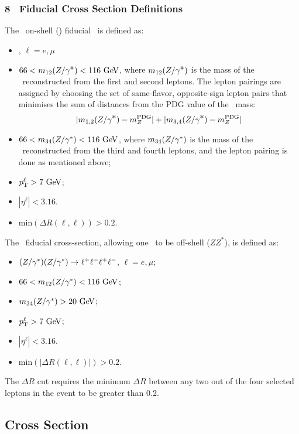 \subsubsection{8 \tev\ Fiducial Cross Section Definitions}

The \zzllll\ on-shell (\ZZ) fiducial \cx\ is defined as:

\begin{itemize}
\item{\ZorgZorglplmlplm, $\ell = e,\mu$}
\item{ $66 < m_{12}(\Zorgv) <  116\GeV$, where $m_{12}(Z/\gamma^{\textstyle *})$ is
the mass of the \Z\ reconstructed from the first and second leptons.  The
lepton pairings are assigned by choosing the set of 
same-flavor, opposite-sign lepton pairs that minimises the sum of distances from
the PDG value of the \Z\ mass:
\begin{equation}
|m_{1,2}(Z/\gamma^{\textstyle *}) - m_{Z}^{\rm PDG}| + |m_{3,4}(Z/\gamma^{\textstyle *}) - m_{Z}^{\rm PDG}|
\end{equation}
}
\item{ $66 < m_{34}(\Z/\gamma^*) <  116\GeV$, where $m_{34}(Z/\gamma^*)$ is
the mass of the \Z\ reconstructed from the third and fourth leptons, and the
lepton pairing is done as mentioned above;}
\item $\pT^{\ell} > 7\GeV$;
\item $|\eta^{\ell}| < 3.16$.
\item{$\mathrm{min}(\Delta R(\ell,\ell)) > 0.2$.}
\end{itemize}

The \zzllll\ fiducial cross-section, allowing one \Z\ to be off-shell ($ZZ^*$), is defined as:

\begin{itemize}
\item $(Z/\gamma^*)(Z/\gamma^*)\rightarrow\ell^+ \ell^-\ell^+ \ell^-$, $\ell = e,\mu$;
\item $66 < m_{12}(\Z/\gamma^*) <  116\GeV$;
\item $m_{34}(\Z/\gamma^*) > 20\GeV$;
\item $\pT^{\ell} > 7\GeV$;
\item $|\eta^{\ell}| < 3.16$.
\item $\mathrm{min}(|\Delta R(\ell,\ell)|) > 0.2$.
\end{itemize}

The $\Delta R$ cut requires the minimum $\Delta R$ between any two out of the
four selected leptons in the event to be greater than 0.2.

\subsection{Cross Section}
